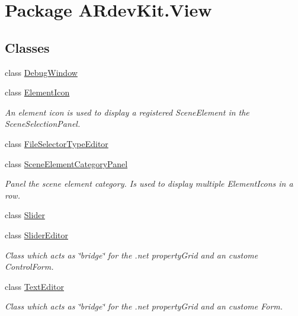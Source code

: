 \hypertarget{namespace_a_rdev_kit_1_1_view}{\section{Package A\-Rdev\-Kit.\-View}
\label{namespace_a_rdev_kit_1_1_view}
}
\subsection*{Classes}
\begin{DoxyCompactItemize}
\item 
class \hyperlink{class_a_rdev_kit_1_1_view_1_1_debug_window}{Debug\-Window}
\item 
class \hyperlink{class_a_rdev_kit_1_1_view_1_1_element_icon}{Element\-Icon}
\begin{DoxyCompactList}\small\item\em An element icon is used to display a registered Scene\-Element in the Scene\-Selection\-Panel. \end{DoxyCompactList}\item 
class \hyperlink{class_a_rdev_kit_1_1_view_1_1_file_selector_type_editor}{File\-Selector\-Type\-Editor}
\item 
class \hyperlink{class_a_rdev_kit_1_1_view_1_1_scene_element_category_panel}{Scene\-Element\-Category\-Panel}
\begin{DoxyCompactList}\small\item\em Panel the scene element category. Is used to display multiple Element\-Icons in a row. \end{DoxyCompactList}\item 
class \hyperlink{class_a_rdev_kit_1_1_view_1_1_slider}{Slider}
\item 
class \hyperlink{class_a_rdev_kit_1_1_view_1_1_slider_editor}{Slider\-Editor}
\begin{DoxyCompactList}\small\item\em Class which acts as \char`\"{}bridge\char`\"{} for the .net property\-Grid and an custome Control\-Form. \end{DoxyCompactList}\item 
class \hyperlink{class_a_rdev_kit_1_1_view_1_1_text_editor}{Text\-Editor}
\begin{DoxyCompactList}\small\item\em Class which acts as \char`\"{}bridge\char`\"{} for the .net property\-Grid and an custome Form. \end{DoxyCompactList}\end{DoxyCompactItemize}
